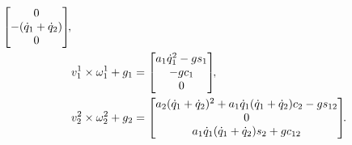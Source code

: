 \begin{align}
\begin{bmatrix}
        0 \\ -(\dot{q}_1 + \dot{q}_2) \\ 0
    \end{bmatrix}\!\!,
    \\
    & v^1_1 \times \omega^1_1 + g_1 =
    \begin{bmatrix}
        a_1 \dot{q}_1^2 - g s_1 \\ -g c_1 \\ 0
    \end{bmatrix}\!\!,
    \\
    & v^2_2 \times \omega^2_2 + g_2 =
    \begin{bmatrix}
    a_2 (\dot{q}_1 + \dot{q}_2)^2 + a_1 \dot{q}_1 (\dot{q}_1 + \dot{q}_2) c_2 - g s_{12} \\
    0 \\
    a_1 \dot{q}_1 (\dot{q}_1 + \dot{q}_2) s_2 + g c_{12}
    \end{bmatrix}\!\!\ldotp
\end{align}

